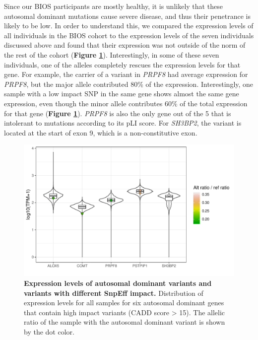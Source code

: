 {{Since our BIOS participants are mostly healthy, it is unlikely that these autosomal dominant mutations cause severe disease, and thus their penetrance is likely to be low. In order to understand this, we compared the expression levels of all individuals in the BIOS cohort to the expression levels of the seven individuals discussed above and found that their expression was not outside of the norm of the rest of the cohort (\textbf{Figure \ref{ase_fig5}}). Interestingly, in some of these seven individuals, one of the alleles completely rescues the expression levels for that gene. For example, the carrier of a variant in \emph{PRPF8} had average expression for \emph{PRPF8}, but the major allele contributed 80\% of the expression. Interestingly, one sample with a low impact SNP in the same gene shows almost the same gene expression, even though the minor allele contributes 60\% of the total expression for that gene (\textbf{Figure \ref{ase_fig5}}). \emph{PRPF8} is also the only gene out of the 5 that is intolerant to mutations according to its pLI score. For \emph{SH3BP2}, the variant is located at the start of exon 9, which is a non-constitutive exon. 

\begin{figure}[h!]
	\includegraphics[width=\textwidth]{chapters/chapter3-allele-specific-expression/img/fig5.pdf}
	\caption{\textbf{Expression levels of autosomal dominant variants and variants with different SnpEff impact.} Distribution of expression levels for all samples for six autosomal dominant genes that contain high impact variants (CADD score > 15). The allelic ratio of the sample with the autosomal dominant variant is shown by the dot color.}
	\label{ase_fig5}
\end{figure}

}}
